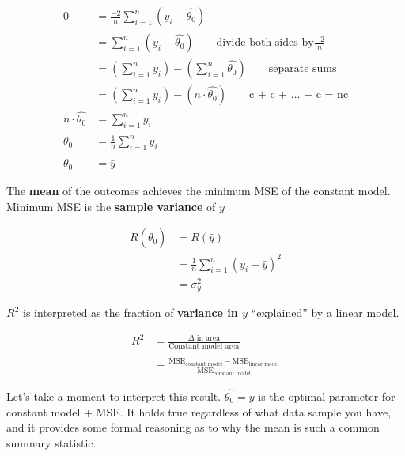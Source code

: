 \documentclass[
  letterpaper,
  DIV=11,
  numbers=noendperiod]{scrreprt}
\begin{document}
\begin{align}
0 &= {\frac{-2}{n}}\sum^{n}_{i=1} (y_i - \hat{\theta_0})
\\ &= \sum^{n}_{i=1} (y_i - \hat{\theta_0}) \quad \quad \text{divide both sides by} \frac{-2}{n}
\\ &= \left(\sum^{n}_{i=1} y_i\right) - \left(\sum^{n}_{i=1} \hat{\theta_0}\right) \quad \quad \text{separate sums}
\\ &= \left(\sum^{n}_{i=1} y_i\right) - (n \cdot \hat{\theta_0}) \quad \quad  \text{c + c + … + c = nc}
\\ n \cdot \hat{\theta_0} &= \sum^{n}_{i=1} y_i
\\ \hat{\theta_0} &= \frac{1}{n} \sum^{n}_{i=1} y_i
\\ \hat{\theta_0} &= \bar{y}
\end{align}

\begin{tcolorbox}[enhanced jigsaw, arc=.35mm, left=2mm, toprule=.15mm, leftrule=.75mm, bottomrule=.15mm, colframe=quarto-callout-note-color-frame, rightrule=.15mm, colbacktitle=quarto-callout-note-color!10!white, opacitybacktitle=0.6, coltitle=black, bottomtitle=1mm, colback=white, toptitle=1mm, title=\textcolor{quarto-callout-note-color}{\faInfo}\hspace{0.5em}{Note}, breakable, opacityback=0, titlerule=0mm]

The \textbf{mean} of the outcomes achieves the minimum MSE of the
constant model. Minimum MSE is the \textbf{sample variance} of \(y\)

\begin{align}
R(\hat{\theta_0}) & = R(\bar{y}) \\
& = \frac{1}{n}\sum_{i=1}^{n}(y_i-\bar{y})^2\\
&= \sigma_y^2
\end{align}

\(R^2\) is interpreted as the fraction of \textbf{variance in \(y\)}
``explained'' by a linear model.

\begin{align}
R^2 &= \frac{\Delta \text{ in area}}{\text{Constant model area}}\\\\
&= \frac{\text{MSE}_\text{constant model} - \text{MSE}_\text{linear model}}{\text{MSE}_\text{constant model}}
\end{align}

\end{tcolorbox}

Let's take a moment to interpret this result.
\(\hat{\theta_0} = \bar{y}\) is the optimal parameter for constant model
+ MSE. It holds true regardless of what data sample you have, and it
provides some formal reasoning as to why the mean is such a common
summary statistic.
\end{document}
